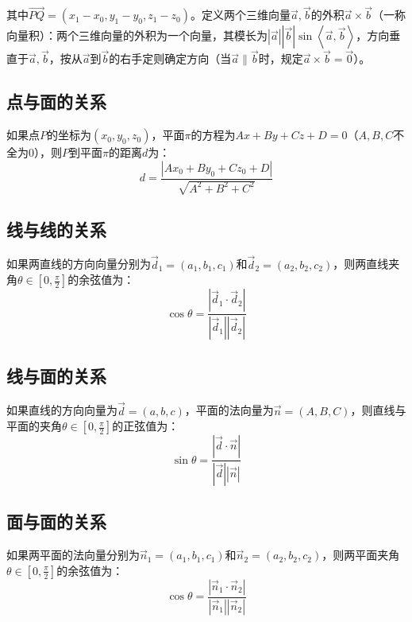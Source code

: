 其中\(\vec{P Q} = \left( x_{1} - x_{0} , y_{1} - y_{0} , z_{1} - z_{0} \right)\)。定义两个三维向量\(\vec{a} , \vec{b}\)的外积\(\vec{a} \times \vec{b}\)（一称向量积）：两个三维向量的外积为一个向量，其模长为\(\left| \vec{a} \right| \left| \vec{b} \right| \sin \left\langle \vec{a} , \vec{b} \right\rangle\)，方向垂直于\(\vec{a} , \vec{b}\)，按从\(\vec{a}\)到\(\vec{b}\)的右手定则确定方向（当\(\vec{a} \parallel \vec{b}\)时，规定\(\vec{a} \times \vec{b} = \vec{0}\)）。

\subsection{点与面的关系}
如果点\(P\)的坐标为\(\left( x_{0} , y_{0} , z_{0} \right)\)，平面\(\pi\)的方程为\(A x + B y + C z + D = 0\)（\(A , B , C\)不全为0），则\(P\)到平面\(\pi\)的距离\(d\)为：
\begin{equation}
    d = \frac{\left| A x_{0} + B y_{0} + C z_{0} + D \right|}{\sqrt{A^{2} + B^{2} + C^{2}}}
\end{equation}

\subsection{线与线的关系}
如果两直线的方向向量分别为\(\vec{d}_{1} = \left( a_{1} , b_{1} , c_{1} \right)\)和\(\vec{d}_{2} = \left( a_{2} , b_{2} , c_{2} \right)\)，则两直线夹角\(\theta \in [0 , \frac{\pi}{2}]\)的余弦值为：
\begin{equation}
    \cos \theta = \frac{\left| \vec{d}_{1} \cdot \vec{d}_{2} \right|}{\left| \vec{d}_{1} \right| \left| \vec{d}_{2} \right|}
\end{equation}

\subsection{线与面的关系}
如果直线的方向向量为\(\vec{d} = \left( a , b , c \right)\)，平面的法向量为\(\vec{n} = \left( A , B , C \right)\)，则直线与平面的夹角\(\theta \in [0 , \frac{\pi}{2}]\)的正弦值为：
\begin{equation}
    \sin \theta = \frac{\left| \vec{d} \cdot \vec{n} \right|}{\left| \vec{d} \right| \left| \vec{n} \right|}
\end{equation}

\subsection{面与面的关系}
如果两平面的法向量分别为\(\vec{n}_{1} = \left( a_{1} , b_{1} , c_{1} \right)\)和\(\vec{n}_{2} = \left( a_{2} , b_{2} , c_{2} \right)\)，则两平面夹角\(\theta \in [0 , \frac{\pi}{2}]\)的余弦值为：
\begin{equation}
    \cos \theta = \frac{\left| \vec{n}_{1} \cdot \vec{n}_{2} \right|}{\left| \vec{n}_{1} \right| \left| \vec{n}_{2} \right|}
\end{equation}

